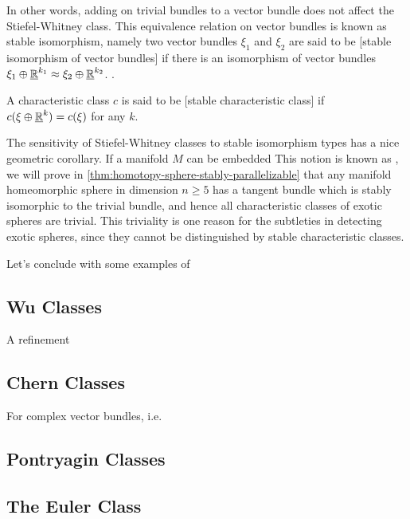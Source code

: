 In other words, adding on trivial bundles to a vector bundle does not affect the Stiefel-Whitney class. This equivalence relation on vector bundles is known as stable isomorphism, namely two vector bundles $\xi_1$ and $\xi_2$ are said to be [stable isomorphism of vector bundles] if there is an isomorphism of vector bundles $\xi_1\oplus \underline{\mathbb{R}}^{k_1} \approx \xi_2\oplus \underline{\mathbb{R}}^{k_2}$. .

\begin{definition}
	A characteristic class $c$ is said to be [stable characteristic class] if $c(\xi\oplus \underline{\mathbb{R}}^k) = c(\xi)$ for any $k$.
\end{definition}

The sensitivity of Stiefel-Whitney classes to stable isomorphism types has a nice geometric corollary. If a manifold $M$ can be embedded 
This notion is known as ,
we will prove in \cref{thm:homotopy-sphere-stably-parallelizable} that any manifold homeomorphic sphere in dimension $n\geq 5$ has a tangent bundle which is stably isomorphic to the trivial bundle, and hence all characteristic classes of exotic spheres are trivial. This triviality is one reason for the subtleties in detecting exotic spheres, since they cannot be distinguished by stable characteristic classes.

Let's conclude with some examples of 
\begin{theorem}

\end{theorem}

\subsection{Wu Classes}

A refinement

\subsection{Chern Classes}

For complex vector bundles, i.e. 

\subsection{Pontryagin Classes}\label{sec:pontryagin-classes}

\subsection{The Euler Class}\label{sec:euler-class}

